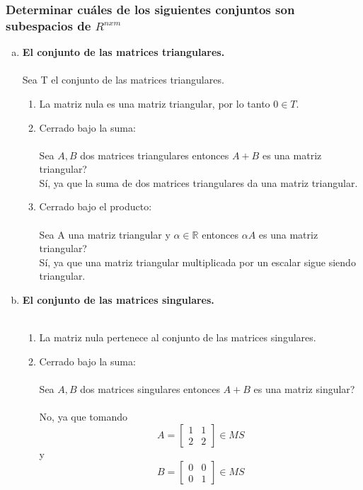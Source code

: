 \documentclass{article}
\begin{document}
\subsubsection{Determinar cuáles de los siguientes conjuntos son subespacios de $R^{nxm}$}
\begin{enumerate}[a.]
\item \textbf{El conjunto de las matrices triangulares.} \\ \\
Sea T el conjunto de las matrices triangulares.
\begin{enumerate}[(1)]
\item
	La matriz nula es una matriz triangular, por lo tanto $0 \in T$.
\item
	Cerrado bajo la suma: \\ \\
	Sea $A,B$ dos matrices triangulares entonces $A+B$ es una matriz triangular? \\
	Sí, ya que la suma de dos matrices triangulares da una matriz triangular. \\
\item
	Cerrado bajo el producto: \\ \\
	Sea A una matriz triangular y $\alpha \in \mathbb{R}$ entonces $\alpha A$ es una matriz triangular? \\
	Sí, ya que una matriz triangular multiplicada por un escalar sigue siendo triangular.
\end{enumerate}


\item \textbf{El conjunto de las matrices singulares.} \\ \\
\begin{enumerate}[(1)]
\item
	La matriz nula pertenece al conjunto de las matrices singulares.
\item
	Cerrado bajo la suma: \\ \\
	Sea $A,B$ dos matrices singulares entonces $A+B$ es una matriz singular? \\ \\
	No, ya que tomando 
	\[
	A =
	\begin{bmatrix}
	1 & 1 \\
	2 & 2
	\end{bmatrix} \in MS
	\]
	y 
	\[
	B =
	\begin{bmatrix}
	0 & 0 \\
	0 & 1
	\end{bmatrix} \in MS
	\] 


\end{enumerate}
\end{enumerate}
\end{document}
